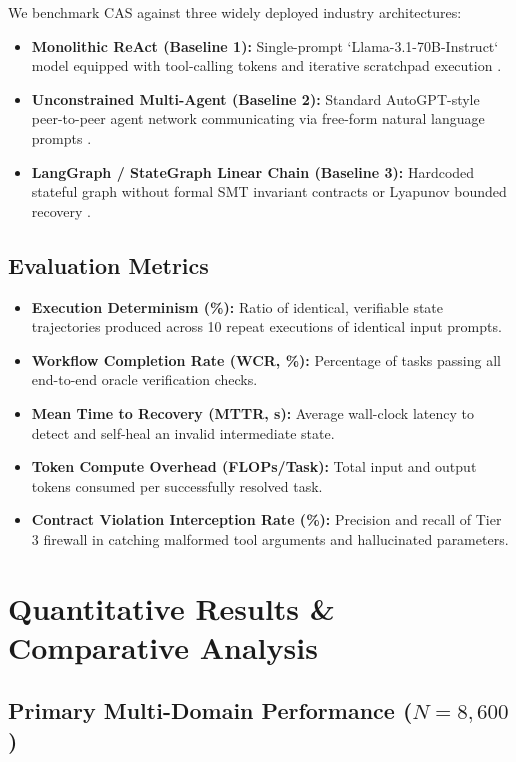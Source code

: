 \documentclass[10pt,twocolumn,letterpaper]{article}
\begin{document}
We benchmark CAS against three widely deployed industry architectures:
\begin{itemize}
  \item \textbf{Monolithic ReAct (Baseline 1):} Single-prompt `Llama-3.1-70B-Instruct` model equipped with tool-calling tokens and iterative scratchpad execution \cite{arxiv_2203_02155}.
  \item \textbf{Unconstrained Multi-Agent (Baseline 2):} Standard AutoGPT-style peer-to-peer agent network communicating via free-form natural language prompts \cite{arxiv_2412_06333}.
  \item \textbf{LangGraph / StateGraph Linear Chain (Baseline 3):} Hardcoded stateful graph without formal SMT invariant contracts or Lyapunov bounded recovery \cite{arxiv_2404_01131}.
\end{itemize}


\subsection{Evaluation Metrics}


\begin{itemize}
  \item \textbf{Execution Determinism (\%):} Ratio of identical, verifiable state trajectories produced across 10 repeat executions of identical input prompts.
  \item \textbf{Workflow Completion Rate (WCR, \%):} Percentage of tasks passing all end-to-end oracle verification checks.
  \item \textbf{Mean Time to Recovery (MTTR, s):} Average wall-clock latency to detect and self-heal an invalid intermediate state.
  \item \textbf{Token Compute Overhead (FLOPs/Task):} Total input and output tokens consumed per successfully resolved task.
  \item \textbf{Contract Violation Interception Rate (\%):} Precision and recall of Tier 3 firewall in catching malformed tool arguments and hallucinated parameters.
\end{itemize}




\section{Quantitative Results \& Comparative Analysis}



\subsection{Primary Multi-Domain Performance ($N = 8,600$)}
\end{document}

